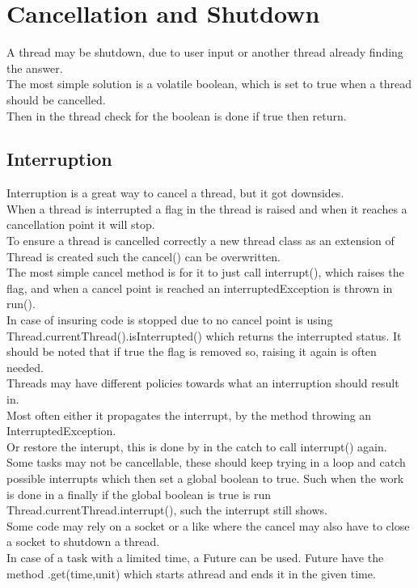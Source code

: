 \documentclass[12pt, a4paper]{article}
\begin{document}
	\section{Cancellation and Shutdown}
		A thread may be shutdown, due to user input or another thread already finding the answer.\\
		The most simple solution is a volatile boolean, which is set to true when a thread should be cancelled.\\
		Then in the thread check for the boolean is done if true then return.\\
		\subsection{Interruption}
			Interruption is a great way to cancel a thread, but it got downsides.\\
			When a thread is interrupted a flag in the thread is raised and when it reaches a cancellation point it will stop.\\
			To ensure a thread is cancelled correctly a new thread class as an extension of Thread is created such the cancel() can be overwritten.\\
			The most simple cancel method is for it to just call interrupt(), which raises the flag, and when a cancel point is reached an interruptedException is thrown in run().\\
			In case of insuring code is stopped due to no cancel point is using Thread.currentThread().isInterrupted() which returns the interrupted status. It should be noted that if true the flag is removed so, raising it again is often needed.\\[4mm]
			Threads may have different policies towards what an interruption should result in.\\
			Most often either it propagates the interrupt, by the method throwing an InterruptedException.\\
			Or restore the interupt, this is done by in the catch to call interrupt() again.\\[4mm]
			Some tasks may not be cancellable, these should keep trying in a loop and catch possible interrupts which then set a global boolean to true. Such when the work is done in a finally if the global boolean is true is run Thread.currentThread.interrupt(), such the interrupt still shows.\\[4mm]
			Some code may rely on a socket or a like where the cancel may also have to close a socket to shutdown a thread.\\
			In case of a task with a limited time, a Future can be used. Future have the method .get(time,unit) which starts athread and ends it in the given time.\\
\end{document}
